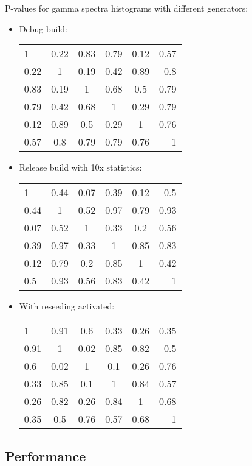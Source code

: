 \documentclass[a4paper, 12pt]{article} %
\begin{document}
    P-values for gamma spectra histograms with different generators:
    \begin{itemize}
     \item Debug build:\\      
      \begin{tabular}{ l c c c c r }
       1 & 0.22 & 0.83 & 0.79 & 0.12 & 0.57 \\
       0.22 & 1 & 0.19 & 0.42 & 0.89 & 0.8 \\
       0.83 & 0.19 & 1 & 0.68 & 0.5 & 0.79 \\
       0.79 & 0.42 & 0.68 & 1 & 0.29 & 0.79 \\
       0.12 & 0.89 & 0.5 & 0.29 & 1 & 0.76 \\
       0.57 & 0.8 & 0.79 & 0.79 & 0.76 & 1 \\
      \end{tabular}
     
      \item Release build with 10x statistics:\\
       \begin{tabular}{ l c c c c r }
	1 & 0.44 & 0.07 & 0.39 & 0.12 & 0.5 \\
	0.44 & 1 & 0.52 & 0.97 & 0.79 & 0.93 \\
	0.07 & 0.52 & 1 & 0.33 & 0.2 & 0.56 \\
	0.39 & 0.97 & 0.33 & 1 & 0.85 & 0.83 \\
	0.12 & 0.79 & 0.2 & 0.85 & 1 & 0.42 \\
	0.5 & 0.93 & 0.56 & 0.83 & 0.42 & 1 \\
       \end{tabular}
      
      \item With reseeding activated:\\
       \begin{tabular}{ l c c c c r }
	1 & 0.91 & 0.6 & 0.33 & 0.26 & 0.35 \\
	0.91 & 1 & 0.02 & 0.85 & 0.82 & 0.5 \\
	0.6 & 0.02 & 1 & 0.1 & 0.26 & 0.76 \\
	0.33 & 0.85 & 0.1 & 1 & 0.84 & 0.57 \\
	0.26 & 0.82 & 0.26 & 0.84 & 1 & 0.68 \\
	0.35 & 0.5 & 0.76 & 0.57 & 0.68 & 1 \\
       \end{tabular}
    \end{itemize}
   \subsection{Performance}
    
    \scalebox{.8}{}
    \scalebox{.8}{}
    \scalebox{.8}{}
    \scalebox{.8}{}
    \scalebox{.8}{}
    \scalebox{.8}{}
    \scalebox{.8}{}
    \scalebox{.8}{}
    \scalebox{.8}{}
    
\end{document}
